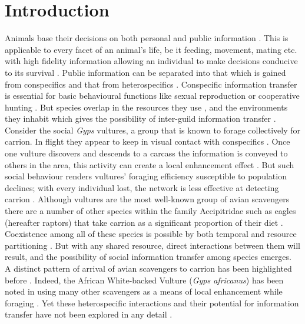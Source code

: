 \section{\uppercase{I}ntroduction}

Animals base their decisions on both personal and public information \citep{dall2005information,schmidt2010ecology,sumpter2008information,couzin2009collective}. This is applicable to every facet of an animal's life, be it feeding, movement, mating etc. with high fidelity information allowing an individual to make decisions conducive to its survival \citep{dall2005information,mcnamara2010information,danchin2004public}. Public information can be separated into that which is gained from conspecifics and that from heterospecifics \citep{dall2005information}. Conspecific information transfer is essential for basic behavioural functions like sexual reproduction or cooperative hunting \citep{handegard2012dynamics}. But species overlap in the resources they use \citep{fedriani2000competition,kruuk1967competition}, and the environments they inhabit \citep{fedriani2000competition,kruuk1967competition} which gives the possibility of inter-guild information transfer \citep{seppanen2007social,seppanen2007interspecific,forsman2009experimental}. \\
\indent
Consider the social \textit{Gyps} vultures, a group that is known to forage collectively for carrion. In flight they appear to keep in visual contact with conspecifics \citep{houston1974food}. Once one vulture discovers and descends to a carcass the information is conveyed to others in the area, this activity can create a local enhancement effect \citep{jackson2008effect}. But such social behaviour renders vultures' foraging efficiency susceptible to population declines; with every individual lost, the network is less effective at detecting carrion \citep{jackson2008effect}. 
Although vultures are the most well-known group of avian scavengers there are a number of other species within the family Accipitridae such as eagles (hereafter raptors) that take carrion as a significant proportion of their diet \citep{mundy1992vultures}. Coexistence among all of these species is possible by both temporal and resource partitioning \citep{mundy1992vultures,houston1975ecological}. But with any shared resource, direct interactions between them will result, and the possibility of social information transfer among species emerges. \\
\indent A distinct pattern of arrival of avian scavengers to carrion has been highlighted before \citep{mundy1982comparative,kendall2013alternative,cortes2012resource}. Indeed, the African White-backed Vulture (\textit{Gyps africanus}) has been noted in using many other scavengers as a means of local enhancement while foraging \citep{kruuk1967competition}. Yet these heterospecific interactions and their potential for information transfer have not been explored in any detail \citep{mundy1982comparative}. \\
